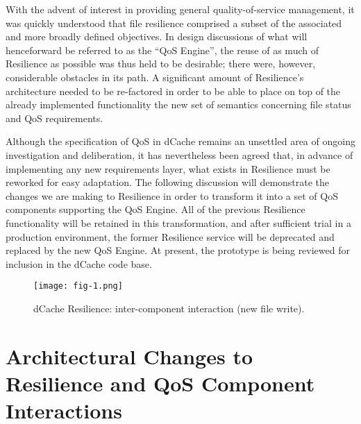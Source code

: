 \documentclass{webofc}
\begin{document}
With the  advent of  interest in providing  general quality-of-service
management, it was quickly understood that file resilience comprised a
subset  of the  associated and  more broadly  defined objectives.   In
design discussions  of what  will henceforward be  referred to  as the
“QoS Engine”, the reuse of as  much of Resilience as possible was thus
held to be  desirable; there were, however,  considerable obstacles in
its path.  A significant amount of Resilience’s architecture needed to
be re-factored  in order  to be  able to  place on  top of  the already
implemented  functionality the  new set  of semantics  concerning file
status and QoS requirements.

Although the specification of QoS  in dCache remains an unsettled area
of ongoing  investigation and  deliberation, it has  nevertheless been
agreed that,  in advance of  implementing any new  requirements layer,
what exists in  Resilience must be reworked for  easy adaptation.  The
following discussion  will demonstrate  the changes  we are  making to
Resilience  in order  to transform  it into  a set  of QoS  components
supporting   the  QoS   Engine.   All   of  the   previous  Resilience
functionality  will  be retained  in  this  transformation, and  after
sufficient trial  in a  production environment, the  former Resilience
service will  be deprecated and  replaced by  the new QoS  Engine.  At
present, the prototype  is being reviewed for inclusion  in the dCache
code base.

\begin{figure}[h]
\centering
\texttt{[image: fig-1.png]}
\caption{dCache Resilience: inter-component interaction (new file write).}
\label{fig-1} 
\end{figure}


\section{Architectural Changes to Resilience and QoS Component Interactions}
\label{sec-2}
\end{document}
